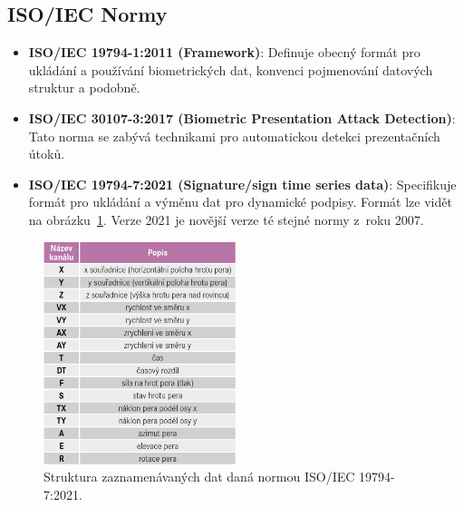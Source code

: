 \subsection*{ISO/IEC Normy}
\begin{itemize}
  \item \textbf{ISO/IEC 19794-1:2011 (Framework)}: 
  Definuje obecný formát pro ukládání a používání biometrických dat, konvenci pojmenování datových struktur a podobně.\cite{iso19794-1_2011} %

  \item \textbf{ISO/IEC 30107-3:2017 (Biometric Presentation Attack Detection)}: 
  Tato norma se zabývá technikami pro automatickou detekci prezentačních útoků.~\cite{ISO/IEC30107-3_2017} %

  \item \textbf{ISO/IEC 19794-7:2021 (Signature/sign time series data)}:
  Specifikuje formát pro ukládání a výměnu dat pro dynamické podpisy. 
  Formát lze vidět na obrázku~\ref{fig:norms_table}. 
  Verze 2021 je novější verze té stejné normy z~roku 2007.~\cite{ISOIEC19794-7_2021} %
\end{itemize}

\begin{figure}[h]
  \centering
  \includegraphics[width=0.5\textwidth]{obrazky-figures/normy.png}
  \caption{Struktura zaznamenávaných dat daná normou ISO/IEC 19794-7:2021.~\cite{DSM2021}} %
  \label{fig:norms_table}
\end{figure}

\newpage

